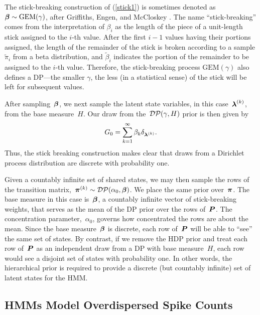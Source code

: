 The stick-breaking construction of (\ref{stick1}) is sometimes denoted
as~${\boldsymbol{\beta} \sim \mathrm{GEM}(\gamma)}$, after Griffiths, Engen, and
McCloskey \citep{Ewens90}.  The name ``stick-breaking'' comes from the
interpretation of $\beta_i$ as the length of the piece of a
unit-length stick assigned to the $i$-th value.  After the first $i-1$
values having their portions assigned, the length of the remainder of
the stick is broken according to a sample $\tilde{\pi}_i$ from a beta
distribution, and $\tilde{\beta}_i$ indicates the portion of the
remainder to be assigned to the $i$-th value. Therefore, the
stick-breaking process $\mathrm{GEM}(\gamma)$ also defines a DP---the
smaller $\gamma$, the less (in a statistical sense) of the stick will
be left for subsequent values.

After sampling~$\boldsymbol{\beta}$, we next sample the latent state variables, in
this case~${\boldsymbol{\lambda}^{(k)}}$, from the base measure~$H$. Our draw from
the~${\mathcal{DP}(\gamma,H)}$ prior is then given by
\begin{align}
G_0=\sum_{k=1}^\infty \beta_k \delta_{\boldsymbol{\lambda}^{(k)}}.
\end{align}
Thus, the stick breaking construction makes clear that draws from a
Dirichlet process distribution are discrete with probability one.

Given a countably infinite set of shared states, we may then sample
the rows of the transition
matrix,~${\boldsymbol{\pi}^{(k)}\sim\mathcal{DP}(\alpha_0,\boldsymbol{\beta})}$. We place the
same prior over~$\boldsymbol{\pi}$.  The base measure in this case is~$\boldsymbol{\beta}$, a
countably infinite vector of stick-breaking weights, that serves as
the mean of the DP prior over the rows of~$\boldsymbol{P}$. The concentration
parameter,~$\alpha_0$, governs how concentrated the rows are about the
mean. Since the base measure~$\boldsymbol{\beta}$ is discrete, each row of~$\boldsymbol{P}$
will be able to ``see'' the same set of states. By contrast, if we
remove the HDP prior and treat each row of~$\boldsymbol{P}$ as an independent draw
from a DP with base measure~$H$, each row would see a disjoint set of
states with probability one. In other words, the hierarchical prior is
required to provide a discrete (but countably infinite) set of latent
states for the HMM.

\subsection{HMMs Model Overdispersed Spike Counts}

